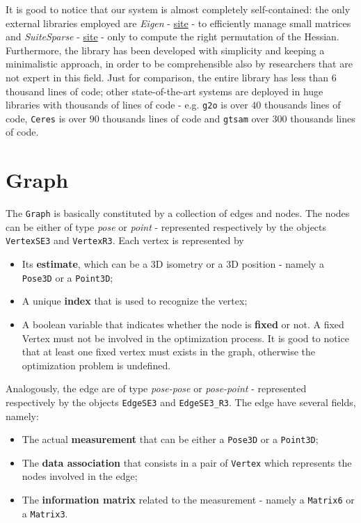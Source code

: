 It is good to notice that our system is almost completely self-contained: the only external libraries employed are \textit{Eigen} - \hyperref{http://eigen.tuxfamily.org}{}{}{site} -  to efficiently manage small matrices  and \textit{SuiteSparse}  - \hyperref{http://faculty.cse.tamu.edu/davis/suitesparse.html}{}{}{site} - only to compute the right permutation of the Hessian. Furthermore, the library has been developed with simplicity and keeping a minimalistic approach, in order to be comprehensible also by researchers that are not expert in this field. Just for comparison, the entire library has less than $6$ thousand lines of code; other state-of-the-art systems are deployed in huge libraries with thousands of lines of code - e.g. \texttt{g2o} \cite{kummerle2011g} is over $40$ thousands lines of code, \texttt{Ceres} \cite{ceres-solver} is over $90$ thousands lines of code and \texttt{gtsam} \cite{dellaert2012gtsam} over $300$ thousands lines of code.

\section{Graph}\label{sec:graph_implementation}
The \texttt{Graph} is basically constituted by a collection of edges and nodes. The nodes can be either of type \textit{pose} or \textit{point} - represented respectively by the objects \texttt{VertexSE3} and \texttt{VertexR3}. Each vertex is represented by

\begin{itemize}
    \item Its \textbf{estimate}, which can be a 3D isometry or a 3D position - namely a \texttt{Pose3D} or a \texttt{Point3D};
    \item A unique \textbf{index} that is used to recognize the vertex;
    \item A boolean variable that indicates whether the node is \textbf{fixed} or not. A fixed Vertex must not be involved in the optimization process. It is good to notice that at least one fixed vertex must exists in the graph, otherwise the optimization problem is undefined.
\end{itemize}

Analogously, the edge are of type \textit{pose-pose} or \textit{pose-point} - represented respectively by the objects \texttt{EdgeSE3} and \texttt{EdgeSE3\_R3}. The edge have several fields, namely:

\begin{itemize}
    \item The actual \textbf{measurement} that can be either a \texttt{Pose3D} or a \texttt{Point3D};
    \item The \textbf{data association} that consists in a pair of \texttt{Vertex} which represents the nodes involved in the edge;
    \item The \textbf{information matrix} related to the measurement - namely a \texttt{Matrix6} or a \texttt{Matrix3}.
\end{itemize}

